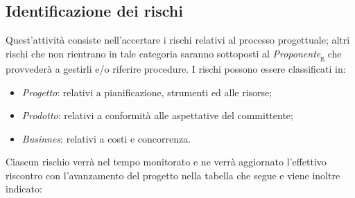 \documentclass[12pt,a4paper,titlepage]{article}
\begin{document}
	\subsection{Identificazione dei rischi}
		Quest'attività consiste nell'accertare i rischi relativi al processo progettuale; altri rischi che non rientrano in tale categoria saranno sottoposti al \textit{Proponente}\textsubscript{g} che provvederà a gestirli e/o riferire procedure.
		I rischi possono essere classificati in:
		\begin{itemize}
			\item \textit{Progetto}: relativi a pianificazione, strumenti ed alle risorse;
			\item \textit{Prodotto}: relativi a conformità alle aspettative del committente;
			\item \textit{Businnes}: relativi a costi e concorrenza.
		\end{itemize}
		Ciascun rischio verrà nel tempo monitorato e ne verrà aggiornato l'effettivo riscontro con l'avanzamento del progetto nella tabella che segue e viene inoltre indicato:
\end{document}
